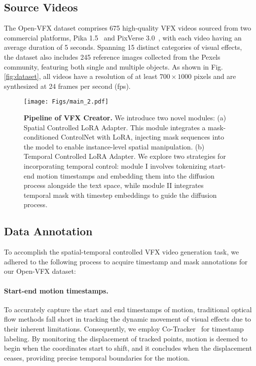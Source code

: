 \subsection{Source Videos}

The Open-VFX dataset comprises 675 high-quality VFX videos sourced from two commercial platforms, Pika 1.5~\cite{pika2023} and PixVerse 3.0~\cite{PixVerse}, with each video having an average duration of 5 seconds. Spanning 15 distinct categories of visual effects, the dataset also includes 245 reference images collected from the Pexels~\cite{pexels2024} community, featuring both single and multiple objects. As shown in Fig. \ref{fig:dataset}, all videos have a resolution of at least \(700 \times 1000\) pixels and are synthesized at 24 frames per second (fps).


\begin{figure}[htbp]
    \centering
    \texttt{[image: Figs/main\_2.pdf]} 
    \caption{\textbf{Pipeline of VFX Creator.} We introduce two novel modules: (a) Spatial Controlled LoRA Adapter. This module integrates a mask-conditioned ControlNet with LoRA, injecting mask sequences into the model to enable instance-level spatial manipulation. (b) Temporal Controlled LoRA Adapter. We explore two strategies for incorporating temporal control:  module I involves tokenizing start-end motion timestamps and embedding them into the diffusion process alongside the text space, while module II integrates temporal mask with timestep embeddings to guide the diffusion process.}
    \label{fig:main}
\end{figure}
\subsection{Data Annotation}
To accomplish the spatial-temporal controlled VFX video generation task, we adhered to the following process to acquire timestamp and mask annotations for our Open-VFX dataset:
\paragraph{Start-end motion timestamps.} To accurately capture the start and end timestamps of motion, traditional optical flow methods fall short in tracking the dynamic movement of visual effects due to their inherent limitations. Consequently, we employ Co-Tracker~\cite{karaev24cotracker3} for timestamp labeling. By monitoring the displacement of tracked points, motion is deemed to begin when the coordinates start to shift, and it concludes when the displacement ceases, providing precise temporal boundaries for the motion. 
